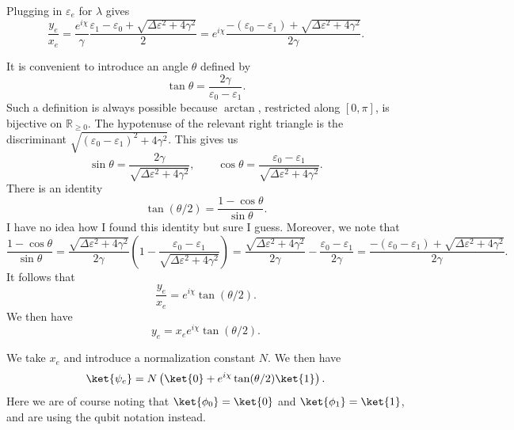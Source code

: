 \documentclass[11pt, letterpaper]{article}
\begin{document}
Plugging in $\varepsilon _e$ for $\lambda $ gives
\[
	\frac{y_e}{x_e} =\frac{e^{i\chi } }{\gamma } \frac{\varepsilon _1-\varepsilon _0+\sqrt{\Delta \varepsilon ^2+4\gamma ^2} }{2} =e^{i\chi } \frac{-(\varepsilon _0-\varepsilon _1)+\sqrt{\Delta \varepsilon ^2+4\gamma ^2} }{2\gamma }
.\]


It is convenient to introduce an angle $\theta $ defined by
\[
	\tan \theta =\frac{2\gamma }{\varepsilon _0-\varepsilon _1} 
.\]
Such a definition is always possible because $\arctan $, restricted along $[0,\pi ]$, is bijective on $\mathbb{R} _{\geq 0} $. The hypotenuse of the relevant right triangle is the discriminant $\sqrt{(\varepsilon _0-\varepsilon _1)^2+4\gamma ^2} $. This gives us
\[
	\sin \theta =\frac{2\gamma }{\sqrt{\Delta \varepsilon ^2+4\gamma ^2} } ,\qquad \cos \theta =\frac{\varepsilon _0-\varepsilon _1}{\sqrt{\Delta \varepsilon ^2+4\gamma ^2} } 
.\]
There is an identity
\[
	\tan (\theta /2)=\frac{1-\cos \theta }{\sin \theta } 
.\]
I have no idea how I found this identity but sure I guess. Moreover, we note that
\[
	\frac{1-\cos \theta }{\sin \theta } =\frac{\sqrt{\Delta \varepsilon ^2+4\gamma ^2} }{2\gamma } \left( 1-\frac{\varepsilon _0-\varepsilon _1}{\sqrt{\Delta \varepsilon ^2+4\gamma ^2} }  \right) =\frac{\sqrt{\Delta \varepsilon ^2+4\gamma ^2} }{2\gamma } -\frac{\varepsilon _0-\varepsilon _1}{2\gamma } =\frac{-(\varepsilon _0-\varepsilon _1)+\sqrt{\Delta \varepsilon ^2+4\gamma ^2} }{2\gamma } 
.\]
It follows that
\[
	\frac{y_e}{x_e} =e^{i\chi } \tan (\theta /2)
.\]
We then have
\[
	y_e=x_e e^{i\chi } \tan (\theta /2)
.\]

We take $x_e$ and introduce a normalization constant $N$. We then have
\[
	\ket{\psi _e}=N\left( \ket{0}+e^{i\chi } \tan (\theta /2)\ket{1} \right) 
.\]
Here we are of course noting that $\ket{\phi _0}=\ket{0}$ and $\ket{\phi _1}=\ket{1}$, and are using the qubit notation instead.
\end{document}
